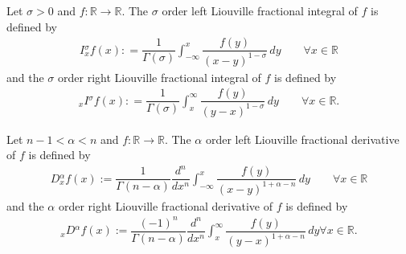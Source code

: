 \documentclass[leqno,final]{siamltex}
\numberwithin{equation}{section}
\renewcommand{\(}{\bigl(}
\renewcommand{\)}{\bigr)}
\newcommand{\R}{\mathbb{R}}
\begin{document}
            \begin{definition} \label{def2.4} 
                Let $\sigma > 0$ and $f:\R \rightarrow \R$. The $\sigma$ order left Liouville fractional integral of $f$ is defined by
                \begin{align*}
                    {}{I}{^{\sigma}_{x}} f(x) : =   \dfrac{1}{\Gamma(\sigma)} \int_{-\infty}^{x} \dfrac{f(y)}{(x - y)^{1 - \sigma}} \, dy \qquad \forall x \in \R
                \end{align*}
                and the $\sigma$ order right Liouville fractional integral of $f$ is defined by 
                \begin{align*}
                    {_{x}}{I}{^{\sigma}} f(x) : =  \dfrac{1}{\Gamma(\sigma)} \int_{x}^{\infty} \dfrac{f(y)}{(y-x)^{1 - \sigma}}\, dy \qquad \forall x \in \R.
                \end{align*}
            \end{definition}


            \begin{definition} \label{def2.5} 
                Let $n-1 < \alpha < n$ and $f:\R \rightarrow \R$. The $\alpha$ order left Liouville fractional derivative of $f$ is defined by 
                \begin{align*}
                    {}{{D}}{_{x}^{\alpha}} f(x):= \dfrac{1}{\Gamma(n - \alpha)} \dfrac{d^{n}}{dx^n}\int_{-\infty}^{x} \dfrac{f(y)}{ (x - y)^{1+\alpha -n}} \,dy \qquad \forall x \in \R
                \end{align*}
                and the $\alpha$ order right Liouville fractional derivative of $f$ is defined by
                \begin{align*}
                    {_{x}}{{D}}{^{\alpha}}f(x) :=  \dfrac{(-1)^{n}}{\Gamma(n - \alpha)} \dfrac{d^n}{dx^n} \int_{x}^{\infty} \dfrac{f(y)}{(y - x)^{1+ \alpha -n}} \,dy \forall x \in \R.
                \end{align*}
            \end{definition}
\end{document}
